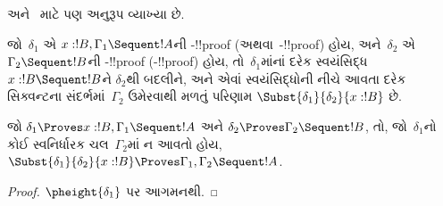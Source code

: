 \documentclass[../../../include/open-logic-section]{subfiles}
\begin{document}
 અને~
માટે પણ અનુરૂપ વ્યાખ્યા છે.

\begin{defn}
જો~$\delta_1$ એ
$x:!B, \Gamma_1 \Sequent !A$ની
-!!{proof}
(અથવા~-!!{proof})
હોય, અને~$\delta_2$ એ
$\Gamma_2 \Sequent !B$ની
-!!{proof}
(-!!{proof}) હોય,
તો~$\delta_1$માંનાં
દરેક સ્વયંસિદ્ધ
$x:!B \Sequent !B$ને
$\delta_2$થી બદલીને,
અને એવાં સ્વયંસિદ્ધોની
નીચે આવતા દરેક સિક્વન્ટના
સંદર્ભમાં~$\Gamma_2$ ઉમેરવાથી
મળતું પરિણામ
$\Subst{\delta_1}{\delta_2}{x:!B}$
છે.
\end{defn}

\begin{prop}
જો $\delta_1 \Proves x:!B, \Gamma_1 \Sequent
!A$ અને $\delta_2 \Proves \Gamma_2 \Sequent !B$,
તો, જો~$\delta_1$નો કોઈ
સ્વનિર્ધારક ચલ~$\Gamma_2$માં
ન આવતો હોય,
$\Subst{\delta_1}{\delta_2}{x:!B} \Proves \Gamma_1, \Gamma_2 \Sequent
!A$.
\end{prop}


\begin{proof}
  $\pheight{\delta_1}$ પર આગમનથી.
\end{proof}
\end{document}
